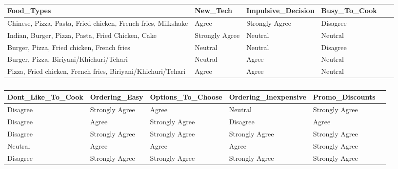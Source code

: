 \documentclass[a4paper,fleqn]{cas-sc}
\begin{document}
\begin{table}[htbp]
    \vspace{1em} %
    
    \begin{subtable}{\textwidth}
        \centering
        \begin{tabular*}{\linewidth}{@{\extracolsep{\fill}}llllll@{}}
            \toprule
            Food\_Types & New\_Tech & Impulsive\_Decision & Busy\_To\_Cook\\
            \midrule
            Chinese, Pizza, Pasta, Fried chicken, French fries, Milkshake & Agree & Strongly Agree & Disagree\\
            Indian, Burger, Pizza, Pasta, Fried Chicken, Cake & Strongly Agree & Neutral & Neutral\\
            Burger, Pizza, Fried chicken, French fries & Neutral & Neutral & Disagree\\
            Burger, Pizza, Biriyani/Khichuri/Tehari & Neutral & Agree & Neutral\\
            Pizza, Fried chicken, French fries, Biriyani/Khichuri/Tehari & Agree & Agree & Neutral\\
            \bottomrule
        \end{tabular*}
        \caption{}
        \label{tab:sample_3}
    \end{subtable}

    \vspace{1em} %
    
    \begin{subtable}{\textwidth}
        \centering
        \begin{tabular*}{\linewidth}{@{\extracolsep{\fill}}llllll@{}}
            \toprule
            Dont\_Like\_To\_Cook & Ordering\_Easy & Options\_To\_Choose & Ordering\_Inexpensive & Promo\_Discounts \\
            \midrule
            Disagree & Strongly Agree & Agree & Neutral & Strongly Agree \\
            Disagree & Agree & Strongly Agree & Disagree & Agree \\
            Disagree & Strongly Agree & Strongly Agree & Strongly Agree & Strongly Agree \\
            Neutral & Agree & Agree & Agree & Strongly Agree \\
            Disagree & Strongly Agree & Strongly Agree & Strongly Agree & Strongly Agree \\
            \bottomrule
        \end{tabular*}
        \caption{}
        \label{tab:sample_4}
    \end{subtable}


\end{table}
\end{document}
